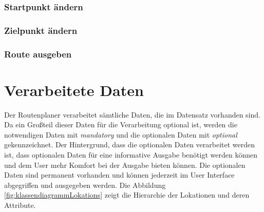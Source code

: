 \documentclass[12pt, a4paper, ngerman]{article}
\begin{document}
\subsubsection{Startpunkt ändern \label{uc:StartpunktAendern}}
\begin{usecase}
\end{usecase}

\subsubsection{Zielpunkt ändern \label{uc:ZielpunktAendern}}
\begin{usecase}
	\uprecondition{\ref{uc:RouteBerechnen}}
\end{usecase}

\subsubsection{Route ausgeben \label{uc:RouteAusgeben}}
\begin{usecase}
\end{usecase}

\section{Verarbeitete Daten \label{attributBeschreibungen}}
Der Routenplaner verarbeitet sämtliche Daten, die im Datensatz vorhanden sind. Da ein Großteil dieser Daten für die Verarbeitung optional ist, werden die notwendigen Daten mit \textit{mandatory} und die optionalen Daten mit \textit{optional} gekennzeichnet. Der Hintergrund, dass die optionalen Daten verarbeitet werden ist, dass optionalen Daten für eine informative Ausgabe benötigt werden können und dem User mehr Komfort bei der Ausgabe bieten können. Die optionalen Daten sind permanent vorhanden und können jederzeit im User Interface abgegriffen und ausgegeben werden.
Die Abbildung \ref{fig:klassendiagrammLokations} zeigt die Hierarchie der Lokationen und deren Attribute.
\end{document}
